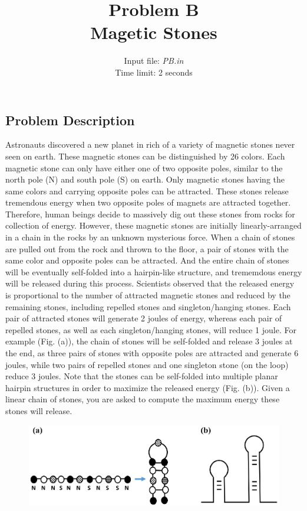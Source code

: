 \documentclass[12pt]{article}
\begin{document}
\title{Problem B \\ Magetic Stones}
\author{Input file: {\em PB.in} \\ Time limit: 2 seconds}
\date{}
\maketitle
\thispagestyle{empty}

\subsection*{Problem Description}
Astronauts discovered a new planet in rich of a variety of magnetic stones never seen on earth.
These magnetic stones can be distinguished by 26 colors. Each magnetic stone can only have either one of two opposite poles, similar to the north pole (N) and south pole (S) on earth. Only magnetic stones having the same colors and carrying opposite poles can be attracted.
These stones release tremendous energy when two opposite poles of magnets are attracted together. 
Therefore, human beings decide to massively dig out these stones from rocks for collection of energy.
However, these magnetic stones are initially linearly-arranged in a chain in the rocks by an unknown mysterious force. When a chain of stones are pulled out from the rock and thrown to the floor, a pair of stones with the same color and opposite poles can be attracted. And the entire chain of stones will be eventually self-folded into a hairpin-like structure, and trememdous energy will be released during this process.
Scientists observed that the released energy is proportional to the number of attracted magnetic stones and reduced by the remaining stones, including repelled stones and singleton/hanging stones. Each pair of attracted stones will generate 2 joules of energy, whereas each pair of repelled stones, as well as each singleton/hanging stones, will reduce 1 joule. For example (Fig. (a)), the chain of stones will be self-folded and release 3 joules at the end, as three pairs of stones with opposite poles are attracted and generate 6 joules, while two pairs of repelled stones and one singleton stone (on the loop) reduce 3 joules. Note that the stones can be self-folded into multiple planar hairpin structures in order to maximize the released energy (Fig. (b)). Given a linear chain of stones, you are asked to compute the maximum energy these stones will release.


 \begin{figure}[!h]
        \centering
        \includegraphics[scale=0.8]{Fig.eps}
        \end{figure}
        
\end{document}
